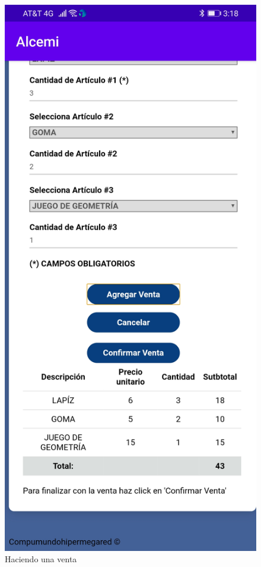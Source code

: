 \documentclass{article}
\begin{document}
\pagebreak

\begin{figure}[h]
\caption {Haciendo una venta}
\centering
\includegraphics[scale=0.16]{fig14}
\end{figure}
\end{document}
